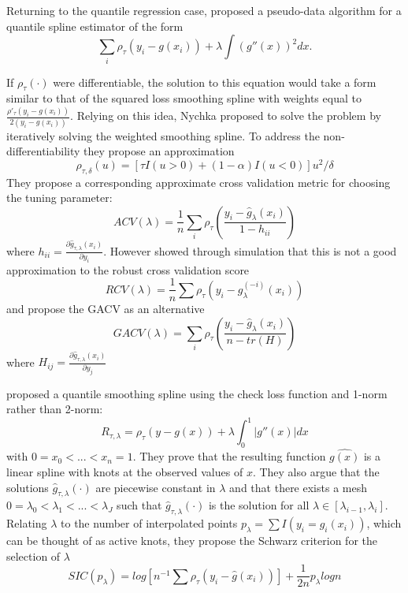 \documentclass[12pt]{article}
\numberwithin{equation}{section}
\theoremstyle{plain}
\begin{document}
Returning to the quantile regression case, \cite{nychka1995nonparametric} proposed a pseudo-data algorithm for a quantile spline estimator of the form 
\begin{equation}
\sum_i \rho_{\tau}(y_i - g(x_i)) + \lambda\int(g''(x))^2dx.
\end{equation}

If $\rho_{\tau}(\cdot)$ were differentiable, the solution to this equation would take a form similar to that of the squared loss smoothing spline with weights equal to $\frac{\rho'_{\tau}(y_i-g(x_i))}{2(y_i - g(x_i))}$. Relying on this idea, Nychka proposed to solve the problem by iteratively solving the weighted smoothing spline. To address the non-differentiability they propose an approximation 
\begin{equation}
\rho_{\tau, \delta}(u) = [\tau I(u>0) + (1-\alpha)I(u<0)]u^2/\delta
\end{equation}
They propose a corresponding approximate cross validation metric for choosing the tuning parameter:
\begin{equation}
ACV(\lambda) = \frac{1}{n}\sum_i \rho_{\tau}\left(\frac{y_i - \widehat{g}_\lambda(x_i)}{1-h_{ii}}\right)
\end{equation}
where $h_{ii} = \frac{\partial\widehat{g}_{\tau, \lambda}(x_i)}{\partial y_i}$. However \cite{yuan2006gacv} showed through simulation that this is not a good approximation to the robust cross validation score
\begin{equation}
RCV(\lambda) = \frac{1}{n}\sum\rho_{\tau}(y_i - g_\lambda^{(-i)}(x_i))
\end{equation}
and propose the GACV as an alternative 
\begin{equation}
GACV(\lambda) = \sum_i \rho_{\tau}\left(\frac{y_i - \widehat{g}_\lambda(x_i)}{n-tr(H)}\right)
\end{equation}
where $H_{ij} = \frac{\partial\widehat{g}_{\tau, \lambda}(x_i)}{\partial y_j}$ 

\cite{KoenkerNgPortnoy1994} proposed a quantile smoothing spline using the check loss function and 1-norm rather than 2-norm:
\begin{equation}
R_{\tau,\lambda} = \rho_{\tau}(y - g(x)) + \lambda\int_0^1|g''(x)|dx
\end{equation}
with $0 = x_0 < ... < x_n = 1$. They prove that the resulting function $\widehat{g(x)}$ is a linear spline with knots at the observed values of $x$. They also argue that the solutions $\widehat{g}_{\tau,\lambda}(\cdot)$ are piecewise constant in $\lambda$ and that there exists a mesh $0= \lambda_0 < \lambda_1 < ... < \lambda_J$ such that $\widehat{g}_{\tau,\lambda}(\cdot)$ is the solution for all $\lambda \in [\lambda_{i-1}, \lambda_i]$. Relating $\lambda$ to the number of interpolated points $p_{\lambda} = \sum I(y_i = \widehat{g}_i(x_i))$, which can be thought of as active knots, they propose the Schwarz criterion for the selection of $\lambda$
\begin{equation}
SIC(p_{\lambda}) = log[n^{-1}\sum\rho_{\tau}(y_i - \widehat{g}(x_i))] + \frac{1}{2n}p_{\lambda}log n
\end{equation}
\end{document}
